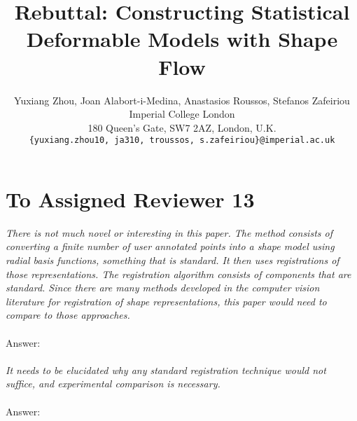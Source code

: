






\title{Rebuttal: Constructing Statistical Deformable Models with Shape Flow}

\author{Yuxiang Zhou, Joan Alabort-i-Medina, Anastasios Roussos, Stefanos Zafeiriou\\
Imperial College London\\
180 Queen’s Gate, SW7 2AZ, London, U.K.\\
{\tt\small \{yuxiang.zhou10, ja310, troussos, s.zafeiriou\}@imperial.ac.uk}}
\maketitle
\thispagestyle{empty}


\section{To Assigned Reviewer 13}

\textit{There is not much novel or interesting in this paper. The method consists of converting a finite number of user annotated points into a shape model using radial basis functions, something that is standard. It then uses registrations of those representations. The registration algorithm consists of components that are standard. Since there are many methods developed in the computer vision literature for registration of shape representations, this paper would need to compare to those approaches.}
\\ \\
Answer:
\\ \\
\textit{It needs to be elucidated why any standard registration technique would not suffice, and experimental comparison is necessary.}
\\ \\
Answer:
\\ \\

